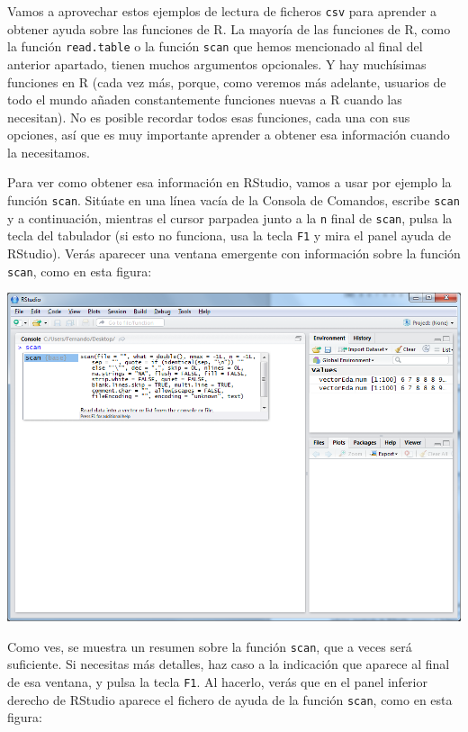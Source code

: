\documentclass[10pt,a4paper]{article}\usepackage[]{graphicx}\usepackage[]{color}
\newcounter {cont01}
\begin{document}
Vamos a aprovechar estos ejemplos de lectura de ficheros {\tt csv} para aprender a obtener ayuda sobre las funciones de R. La mayoría de las funciones de R, como la función {\tt read.table} o la función {\tt scan} que hemos mencionado al final del anterior apartado, tienen muchos argumentos opcionales. Y hay muchísimas funciones en R (cada vez más, porque, como veremos más adelante, usuarios de todo el mundo añaden constantemente  funciones nuevas a R cuando las necesitan). No es posible recordar todos esas funciones, cada una con sus opciones, así que es muy importante aprender a obtener esa información cuando la necesitamos.

Para ver como obtener esa información en RStudio, vamos a usar por ejemplo la función {\tt scan}. Sitúate en una línea vacía de la Consola de Comandos, escribe {\tt scan} y a continuación, mientras el cursor parpadea junto a la {\tt n} final de {\tt scan}, pulsa la tecla del tabulador (si esto no funciona, usa la tecla {\tt F1} y mira el panel ayuda de RStudio). Verás aparecer una ventana emergente con información sobre la función {\tt scan}, como en esta figura:
    \begin{center}
    \includegraphics[width=15cm]{../fig/Tut02-08.png}
    \end{center}
Como ves, se muestra un resumen sobre la función {\tt scan}, que a veces será suficiente. Si necesitas más detalles, haz caso a la indicación que aparece al final de esa ventana, y pulsa la tecla {\tt F1}. Al hacerlo, verás que en el panel inferior derecho de RStudio aparece el {\sf fichero de ayuda} de la función {\tt scan}, como en esta figura:
\end{document}
